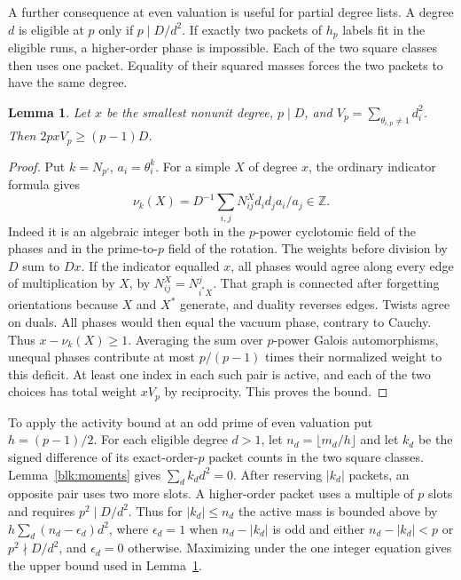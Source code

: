 \documentclass[11pt]{amsart}
\numberwithin{equation}{section}
\newtheorem{lemma}[theorem]{Lemma}
\begin{document}
A further consequence at even valuation is useful for partial degree lists. A degree $d$ is eligible at $p$ only if $p\mid D/d^2$. If exactly two packets of $h_p$ labels fit in the eligible runs, a higher-order phase is impossible. Each of the two square classes then uses one packet. Equality of their squared masses forces the two packets to have the same degree.

\begin{lemma}\label{blk:activity}
Let $x$ be the smallest nonunit degree, $p\mid D$, and $V_p=\sum_{\theta_{i,p}\ne1}d_i^2$. Then $2px V_p\ge(p-1)D$.
\end{lemma}
\begin{proof}
Put $k=N_{p'}$, $a_i=\theta_i^k$. For a simple $X$ of degree $x$, the ordinary indicator formula \cite[Theorem~7.5]{NSfs} gives
\[
 \nu_k(X)=D^{-1}\sum_{i,j}N_{ij}^X d_i d_j a_i/a_j\in\mathbb Z.
\]
Indeed it is an algebraic integer both in the $p$-power cyclotomic field of the phases and in the prime-to-$p$ field of the rotation. The weights before division by $D$ sum to $Dx$. If the indicator equalled $x$, all phases would agree along every edge of multiplication by $X$, by $N_{ij}^X=N_{i^*X}^{j}$. That graph is connected after forgetting orientations because $X$ and $X^*$ generate, and duality reverses edges. Twists agree on duals. All phases would then equal the vacuum phase, contrary to Cauchy. Thus $x-\nu_k(X)\ge1$. Averaging the sum over $p$-power Galois automorphisms, unequal phases contribute at most $p/(p-1)$ times their normalized weight to this deficit. At least one index in each such pair is active, and each of the two choices has total weight $xV_p$ by reciprocity. This proves the bound.

\end{proof}

To apply the activity bound at an odd prime of even valuation put $h=(p-1)/2$. For each eligible degree $d>1$, let $n_d=\lfloor m_d/h\rfloor$ and let $k_d$ be the signed difference of its exact-order-$p$ packet counts in the two square classes. Lemma~\ref{blk:moments} gives $\sum_d k_dd^2=0$. After reserving $|k_d|$ packets, an opposite pair uses two more slots. A higher-order packet uses a multiple of $p$ slots and requires $p^2\mid D/d^2$. Thus for $|k_d|\le n_d$ the active mass is bounded above by $h\sum_d (n_d-\epsilon_d)d^2$, where $\epsilon_d=1$ when $n_d-|k_d|$ is odd and either $n_d-|k_d|<p$ or $p^2\nmid D/d^2$, and $\epsilon_d=0$ otherwise. Maximizing under the one integer equation gives the upper bound used in Lemma~\ref{blk:activity}.
\end{document}
